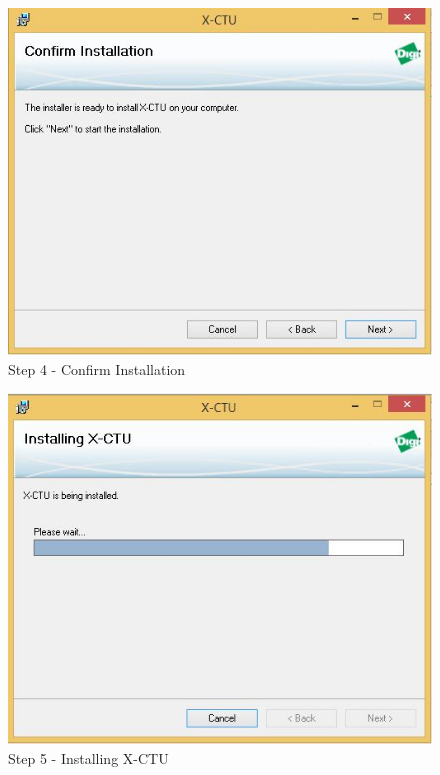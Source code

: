 \begin{flushleft}
\newpage

\begin{figure}
\begin{center}
\includegraphics[scale=0.5]{zigbee_4}
\end{center}
\caption{Step 4 - Confirm Installation}
\label{zstep4}
\end{figure}
\medskip

\begin{figure}
\begin{center}
\includegraphics[scale=0.5]{zigbee_5}
\end{center}
\caption{Step 5 - Installing X-CTU}
\label{zstep5}
\end{figure}
\medskip



\end{flushleft}
